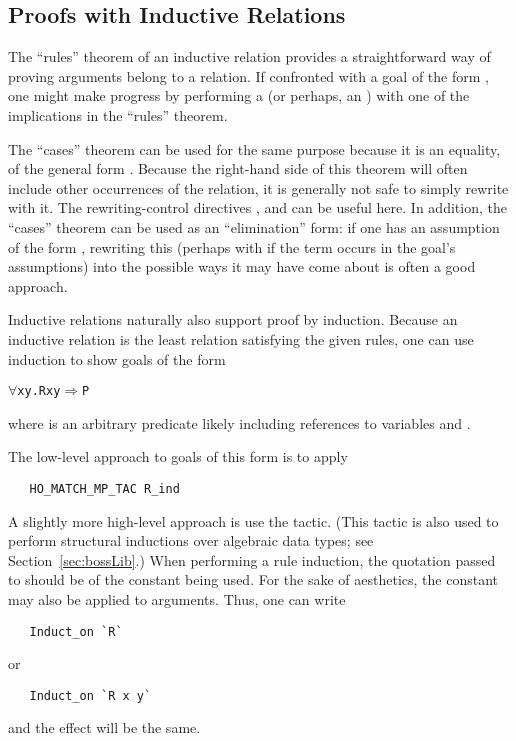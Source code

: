 \subsection{Proofs with Inductive Relations}

The ``rules'' theorem of an inductive relation provides a straightforward way of proving arguments belong to a relation.
If confronted with a goal of the form , one might make progress by performing a  (or perhaps, an ) with one of the implications in the ``rules'' theorem.

The ``cases'' theorem can be used for the same purpose because it is an equality, of the general form .
Because the right-hand side of this theorem will often include other occurrences of the relation, it is generally not safe to simply rewrite with it.
The rewriting-control directives ,  and  can be useful here.
In addition, the ``cases'' theorem can be used as an ``elimination'' form: if one has an assumption of the form , rewriting this (perhaps with  if the term occurs in the goal's assumptions) into the possible ways it may have come about is often a good approach.

Inductive relations naturally also support proof by induction.
Because an inductive relation is the least relation satisfying the given rules, one can use induction to show goals of the form
\begin{alltt}
   \(\forall\)x y. R x y \(\Rightarrow\) P
\end{alltt}
where  is an arbitrary predicate likely including references to variables  and .

The low-level approach to goals of this form is to apply
\begin{verbatim}
   HO_MATCH_MP_TAC R_ind
\end{verbatim}
A slightly more high-level approach is use the  tactic.
(This tactic is also used to perform structural inductions over algebraic data types; see Section~\ref{sec:bossLib}.)
When performing a rule induction, the quotation passed to  should be of the constant being used.
For the sake of aesthetics, the constant may also be applied to arguments.
Thus, one can write
\begin{verbatim}
   Induct_on `R`
\end{verbatim}
or
\begin{verbatim}
   Induct_on `R x y`
\end{verbatim}
and the effect will be the same.


